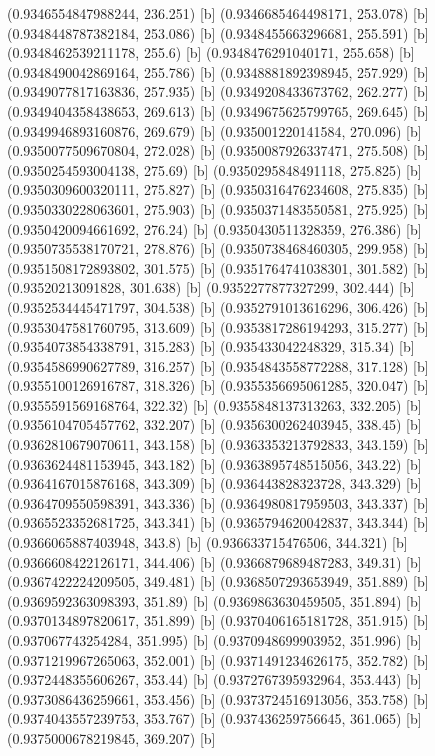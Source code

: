 {{{(0.9346554847988244, 236.251) [b] 
(0.9346685464498171, 253.078) [b] 
(0.9348448787382184, 253.086) [b] 
(0.9348455663296681, 255.591) [b] 
(0.9348462539211178, 255.6) [b] 
(0.9348476291040171, 255.658) [b] 
(0.9348490042869164, 255.786) [b] 
(0.9348881892398945, 257.929) [b] 
(0.9349077817163836, 257.935) [b] 
(0.9349208433673762, 262.277) [b] 
(0.9349404358438653, 269.613) [b] 
(0.9349675625799765, 269.645) [b] 
(0.9349946893160876, 269.679) [b] 
(0.935001220141584, 270.096) [b] 
(0.9350077509670804, 272.028) [b] 
(0.9350087926337471, 275.508) [b] 
(0.9350254593004138, 275.69) [b] 
(0.9350295848491118, 275.825) [b] 
(0.9350309600320111, 275.827) [b] 
(0.9350316476234608, 275.835) [b] 
(0.9350330228063601, 275.903) [b] 
(0.9350371483550581, 275.925) [b] 
(0.9350420094661692, 276.24) [b] 
(0.9350430511328359, 276.386) [b] 
(0.9350735538170721, 278.876) [b] 
(0.9350738468460305, 299.958) [b] 
(0.9351508172893802, 301.575) [b] 
(0.9351764741038301, 301.582) [b] 
(0.93520213091828, 301.638) [b] 
(0.9352277877327299, 302.444) [b] 
(0.9352534445471797, 304.538) [b] 
(0.9352791013616296, 306.426) [b] 
(0.9353047581760795, 313.609) [b] 
(0.9353817286194293, 315.277) [b] 
(0.9354073854338791, 315.283) [b] 
(0.935433042248329, 315.34) [b] 
(0.9354586990627789, 316.257) [b] 
(0.9354843558772288, 317.128) [b] 
(0.9355100126916787, 318.326) [b] 
(0.9355356695061285, 320.047) [b] 
(0.9355591569168764, 322.32) [b] 
(0.9355848137313263, 332.205) [b] 
(0.9356104705457762, 332.207) [b] 
(0.9356300262403945, 338.45) [b] 
(0.9362810679070611, 343.158) [b] 
(0.9363353213792833, 343.159) [b] 
(0.9363624481153945, 343.182) [b] 
(0.9363895748515056, 343.22) [b] 
(0.9364167015876168, 343.309) [b] 
(0.936443828323728, 343.329) [b] 
(0.9364709550598391, 343.336) [b] 
(0.9364980817959503, 343.337) [b] 
(0.9365523352681725, 343.341) [b] 
(0.9365794620042837, 343.344) [b] 
(0.9366065887403948, 343.8) [b] 
(0.936633715476506, 344.321) [b] 
(0.9366608422126171, 344.406) [b] 
(0.9366879689487283, 349.31) [b] 
(0.9367422224209505, 349.481) [b] 
(0.9368507293653949, 351.889) [b] 
(0.9369592363098393, 351.89) [b] 
(0.9369863630459505, 351.894) [b] 
(0.9370134897820617, 351.899) [b] 
(0.9370406165181728, 351.915) [b] 
(0.937067743254284, 351.995) [b] 
(0.9370948699903952, 351.996) [b] 
(0.9371219967265063, 352.001) [b] 
(0.9371491234626175, 352.782) [b] 
(0.9372448355606267, 353.44) [b] 
(0.9372767395932964, 353.443) [b] 
(0.9373086436259661, 353.456) [b] 
(0.9373724516913056, 353.758) [b] 
(0.9374043557239753, 353.767) [b] 
(0.937436259756645, 361.065) [b] 
(0.9375000678219845, 369.207) [b] 
}}}
